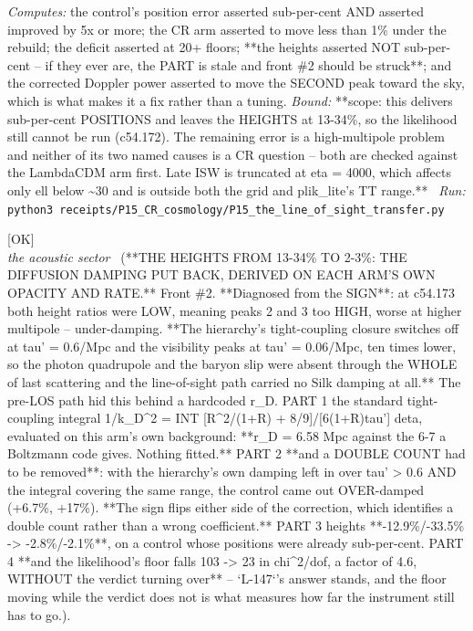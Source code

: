\begin{description}
\emph{Computes:} the control's position error asserted sub-per-cent AND asserted improved by 5x or more; the CR arm asserted to move less than 1\% under the rebuild; the deficit asserted at 20+ floors; **the heights asserted NOT sub-per-cent -- if they ever are, the PART is stale and front \#2 should be struck**; and the corrected Doppler power asserted to move the SECOND peak toward the sky, which is what makes it a fix rather than a tuning.
 \emph{Bound:} **scope: this delivers sub-per-cent POSITIONS and leaves the HEIGHTS at 13-34\%, so the likelihood still cannot be run (c54.172). The remaining error is a high-multipole problem and neither of its two named causes is a CR question -- both are checked against the LambdaCDM arm first. Late ISW is truncated at eta = 4000, which affects only ell below \textasciitilde{}30 and is outside both the grid and plik\_lite's TT range.**
\ \emph{Run:} \texttt{python3 receipts/P15\_CR\_cosmology/P15\_the\_line\_of\_sight\_transfer.py}
\item[\label{rcpt:P15_the_derived_diffusion_damping}\texttt{P15\_the\_derived\_diffusion\_damping}]\hfill\textsf{[OK]}\\
\textit{the acoustic sector} \ (**THE HEIGHTS FROM 13-34\% TO 2-3\%: THE DIFFUSION DAMPING PUT BACK, DERIVED ON EACH ARM'S OWN OPACITY AND RATE.** Front \#2. **Diagnosed from the SIGN**: at c54.173 both height ratios were LOW, meaning peaks 2 and 3 too HIGH, worse at higher multipole -- under-damping. **The hierarchy's tight-coupling closure switches off at tau' = 0.6/Mpc and the visibility peaks at tau' = 0.06/Mpc, ten times lower, so the photon quadrupole and the baryon slip were absent through the WHOLE of last scattering and the line-of-sight path carried no Silk damping at all.** The pre-LOS path hid this behind a hardcoded r\_D. PART 1 the standard tight-coupling integral 1/k\_D\textasciicircum{}2 = INT [R\textasciicircum{}2/(1+R) + 8/9]/[6(1+R)tau'] deta, evaluated on this arm's own background: **r\_D = 6.58 Mpc against the 6-7 a Boltzmann code gives. Nothing fitted.** PART 2 **and a DOUBLE COUNT had to be removed**: with the hierarchy's own damping left in over tau' > 0.6 AND the integral covering the same range, the control came out OVER-damped (+6.7\%, +17\%). **The sign flips either side of the correction, which identifies a double count rather than a wrong coefficient.** PART 3 heights **-12.9\%/-33.5\% -> -2.8\%/-2.1\%**, on a control whose positions were already sub-per-cent. PART 4 **and the likelihood's floor falls 103 -> 23 in chi\textasciicircum{}2/dof, a factor of 4.6, WITHOUT the verdict turning over** -- `L-147`'s answer stands, and the floor moving while the verdict does not is what measures how far the instrument still has to go.). 

\end{description}
